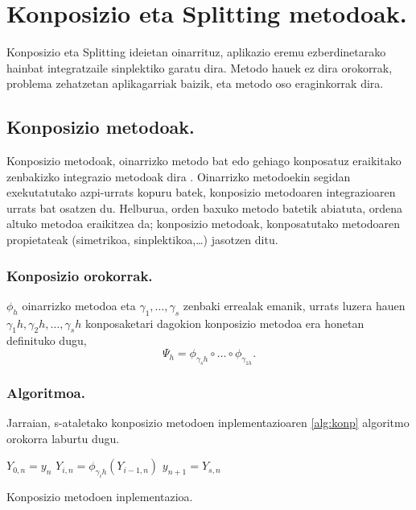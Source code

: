 \section{Konposizio eta Splitting metodoak.}

Konposizio eta Splitting ideietan oinarrituz, aplikazio eremu ezberdinetarako hainbat integratzaile sinplektiko \cite{SSerna2015b} garatu dira. Metodo hauek ez dira orokorrak, problema zehatzetan aplikagarriak baizik, eta metodo oso eraginkorrak dira.

\subsection{Konposizio metodoak.}

Konposizio metodoak, oinarrizko metodo bat edo gehiago konposatuz eraikitako zenbakizko integrazio metodoak dira \cite{Hairer2006}.  Oinarrizko metodoekin segidan exekutatutako azpi-urrats kopuru batek, konposizio metodoaren integrazioaren urrats bat osatzen du. Helburua, orden baxuko metodo batetik abiatuta, ordena altuko metodoa eraikitzea da; konposizio metodoak, konposatutako metodoaren propietateak (simetrikoa, sinplektikoa,\dots) jasotzen ditu. 

\subsubsection*{Konposizio orokorrak.}
$\phi_h$ oinarrizko metodoa eta $\gamma_1,\dots,\gamma_s$ zenbaki errealak emanik, urrats luzera hauen $\gamma_1 h,\gamma_2 h,\dots,\gamma_s h$ konposaketari dagokion konposizio metodoa era honetan definituko dugu,
\begin{equation}
\Psi_h=\phi_{\gamma_s h} \circ \dots \circ \phi_{\gamma_{1 h}}.
\end{equation}

\subsubsection*{Algoritmoa.}
Jarraian, s-ataletako konposizio metodoen inplementazioaren \ref{alg:konp} algoritmo orokorra laburtu dugu.

\begin{algorithm}[H]
 \BlankLine
  {
   \BlankLine
    $Y_{0,n}=y_{n} $\;
    \BlankLine
   {
    \BlankLine 
    $Y_{i,n}=\phi_{\gamma_i h}(Y_{i-1,n})$\;
   }
   \BlankLine
    $y_{n+1}=Y_{s,n}$\;
   \BlankLine
 }
 \caption{Konposizio metodoen inplementazioa.}
 \label{alg:konp}
\end{algorithm}
 
